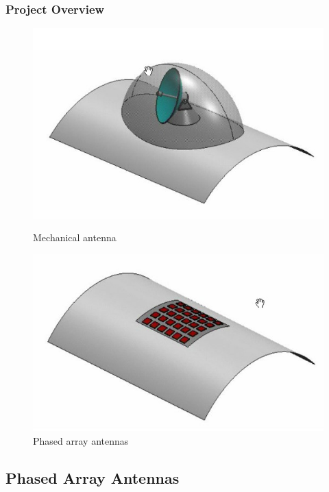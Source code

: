\documentclass{beamer}
\begin{document}
\begin{frame}\frametitle{Project Overview}
	\begin{figure}[H]
		\begin{minipage}[t]{0.45\textwidth}
			\centering
			\includegraphics[width=\linewidth]{images/past_antenna1}
			\caption{Mechanical antenna}
			\label{fig:past_antenna1}
		\end{minipage}
			\hspace{\fill}
		\begin{minipage}[t]{0.45\textwidth}
			\centering
			\includegraphics[width=\linewidth]{images/paa_1}
			\caption{Phased array antennas}
			\label{fig:paa_1}
		\end{minipage}
	\end{figure}
\end{frame}

\subsection{Phased Array Antennas}
\end{document}
